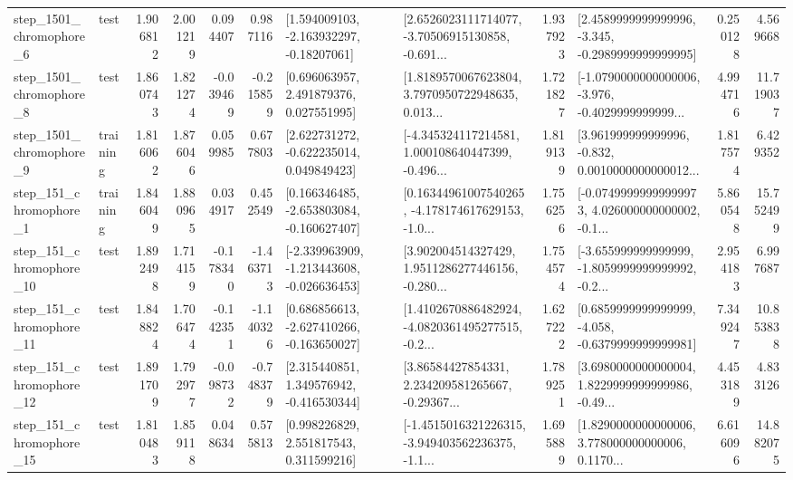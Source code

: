 \begin{tabular}{llrrrrllrlrr}
  step\_1501\_chromophore\_6 &      test &      1.906812 &    2.001219 &      0.094407 &  0.987116 &    [1.594009103, -2.163932297, -0.18207061] &  [2.6526023111714077, -3.70506915130858, -0.691... &       1.937923 &  [2.4589999999999996, -3.345, -0.2989999999999995] &            0.250128 &          4.569668 \\
  step\_1501\_chromophore\_8 &      test &      1.860743 &    1.821274 &     -0.039469 & -0.215859 &     [0.696063957, 2.491879376, 0.027551995] &  [1.8189570067623804, 3.7970950722948635, 0.013... &       1.721827 &  [-1.0790000000000006, -3.976, -0.4029999999999... &            4.994716 &         11.719037 \\
  step\_1501\_chromophore\_9 &  training &      1.816062 &    1.876046 &      0.059985 &  0.677803 &    [2.622731272, -0.622235014, 0.049849423] &  [-4.345324117214581, 1.000108640447399, -0.496... &       1.819139 &  [3.961999999999996, -0.832, 0.0010000000000012... &            1.817574 &          6.429352 \\
   step\_151\_chromophore\_1 &  training &      1.846049 &    1.880965 &      0.034917 &  0.452549 &   [0.166346485, -2.653803084, -0.160627407] &  [0.16344961007540265, -4.178174617629153, -1.0... &       1.756256 &  [-0.07499999999999973, 4.026000000000002, -0.1... &            5.860548 &         15.752499 \\
  step\_151\_chromophore\_10 &      test &      1.892498 &    1.714159 &     -0.178340 & -1.463713 &  [-2.339963909, -1.213443608, -0.026636453] &  [3.902004514327429, 1.9511286277446156, -0.280... &       1.754574 &  [-3.655999999999999, -1.8059999999999992, -0.2... &            2.954183 &          6.997687 \\
  step\_151\_chromophore\_11 &      test &      1.848824 &    1.706474 &     -0.142351 & -1.140326 &   [0.686856613, -2.627410266, -0.163650027] &  [1.4102670886482924, -4.0820361495277515, -0.2... &       1.627222 &  [0.6859999999999999, -4.058, -0.6379999999999981] &            7.349247 &         10.853838 \\
  step\_151\_chromophore\_12 &      test &      1.891709 &    1.792977 &     -0.098732 & -0.748379 &    [2.315440851, 1.349576942, -0.416530344] &  [3.86584427854331, 2.234209581265667, -0.29367... &       1.789251 &  [3.6980000000000004, 1.8229999999999986, -0.49... &            4.453189 &          4.833126 \\
  step\_151\_chromophore\_15 &      test &      1.810483 &    1.859118 &      0.048634 &  0.575813 &     [0.998226829, 2.551817543, 0.311599216] &  [-1.4515016321226315, -3.949403562236375, -1.1... &       1.695889 &  [1.8290000000000006, 3.778000000000006, 0.1170... &            6.616096 &         14.882075 \\

\end{tabular}
